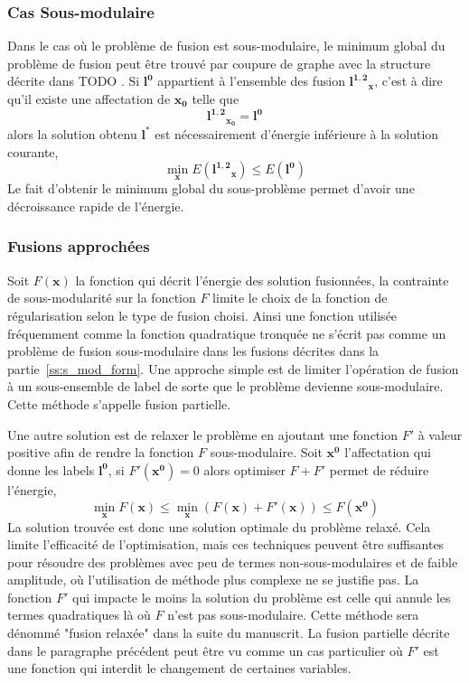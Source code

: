 \documentclass[../main/These_Mathias_Paget.tex]{subfiles}
\begin{document}
\subsubsection{Cas Sous-modulaire}

Dans le cas où le problème de fusion est sous-modulaire, le minimum global du problème de fusion peut être trouvé par coupure de graphe avec la structure décrite dans TODO . Si $\boldsymbol{l^0}$ appartient à l'ensemble des fusion $\boldsymbol{l^{1,2}}_{\boldsymbol{x}}$, c'est à dire qu'il existe une affectation de $\boldsymbol{x_0}$ telle que
\begin{equation}
	\boldsymbol{l^{1,2}}_{\boldsymbol{x_0}} = \boldsymbol{l^0}
\end{equation}
alors la solution obtenu $\boldsymbol{l^*}$ est nécessairement d’énergie inférieure à la solution courante,
\begin{equation}
	\min_{\boldsymbol{x}}{E(\boldsymbol{l^{1,2}}_{\boldsymbol{x}})} \leq E(\boldsymbol{l^0})
\end{equation}
Le fait d’obtenir le minimum global du sous-problème permet d'avoir une décroissance rapide de l’énergie.

\subsubsection{Fusions approchées}

	Soit $F(\boldsymbol{x})$ la fonction qui décrit l’énergie des solution fusionnées, la contrainte de sous-modularité sur la fonction $F$ limite le choix de la fonction de régularisation selon le type de fusion choisi. Ainsi une fonction utilisée fréquemment comme la fonction quadratique tronquée ne s'écrit pas comme un problème de fusion sous-modulaire dans les fusions décrites dans la partie~\ref{ss:s_mod_form}. Une approche simple est de limiter l'opération de fusion à un sous-ensemble de label de sorte que le problème devienne sous-modulaire. Cette méthode s'appelle fusion partielle.
	
	Une autre solution est de relaxer le problème en ajoutant une fonction $F'$ à valeur positive afin de rendre la fonction $F$ sous-modulaire. Soit $\boldsymbol{x^0}$ l'affectation qui donne les labels $\boldsymbol{l^0}$, si $F'(\boldsymbol{x^0})=0$ alors optimiser $F+F'$ permet de réduire l’énergie,
	\begin{equation}
	\min_{\boldsymbol{x}}{F(\boldsymbol{x})} \leq \min_{\boldsymbol{x}}{( F(\boldsymbol{x}) + F'(\boldsymbol{x}) )} \leq F(\boldsymbol{x^0})
	\end{equation}
La solution trouvée est donc une solution optimale du problème relaxé. Cela limite l’efficacité de l'optimisation, mais ces techniques peuvent être suffisantes pour résoudre des problèmes avec peu de termes non-sous-modulaires et de faible amplitude, où l'utilisation de méthode plus complexe ne se justifie pas. La fonction $F'$ qui impacte le moins la solution du problème est celle qui annule les termes quadratiques là où $F$ n'est pas sous-modulaire. Cette méthode sera dénommé "fusion relaxée" dans la suite du manuscrit. La fusion partielle décrite dans le paragraphe précédent peut être vu comme un cas particulier où $F'$ est une fonction qui interdit le changement de certaines variables.
	
\end{document}
